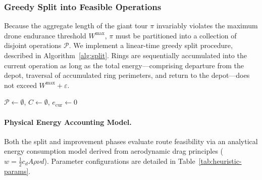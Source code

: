 \documentclass[12pt]{elsarticle}
\begin{document}
\subsubsection{Greedy Split into Feasible Operations}\label{sec:split}

Because the aggregate length of the giant tour $\pi$ invariably violates the maximum drone endurance threshold $W^{\max}$, $\pi$ must be partitioned into a collection of disjoint operations $\mathcal{P}$. We implement a linear-time greedy split procedure, described in Algorithm~\ref{alg:split}. Rings are sequentially accumulated into the current operation as long as the total energy—comprising departure from the depot, traversal of accumulated ring perimeters, and return to the depot—does not exceed $W^{\max} + \varepsilon$.

\begin{algorithm}[t]
	\SetAlgoLined
	\BlankLine
	$\mathcal{P}\gets\emptyset$, $C\gets\emptyset$, $e_{\text{cur}}\gets0$ \;
	\caption{Greedy split procedure for endurance-feasible operations.}
	\label{alg:split}
\end{algorithm}

\paragraph{Physical Energy Accounting Model.}
Both the split and improvement phases evaluate route feasibility via an analytical energy consumption model derived from aerodynamic drag principles ($w = \frac{1}{2} c_d A \rho \nu d$). Parameter configurations are detailed in Table~\ref{tab:heuristic-params}. 
\end{document}
